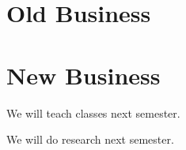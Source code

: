 \documentclass[11pt]{meetingmins}
\begin{document}
\section{Old Business}
\begin{items}
\item
\priormins
\end{items}

\section{New Business}
\begin{items}
\item
We will teach classes next semester.

\item
We will do research next semester.
\end{items}

\vspace{1em}
\end{document}
